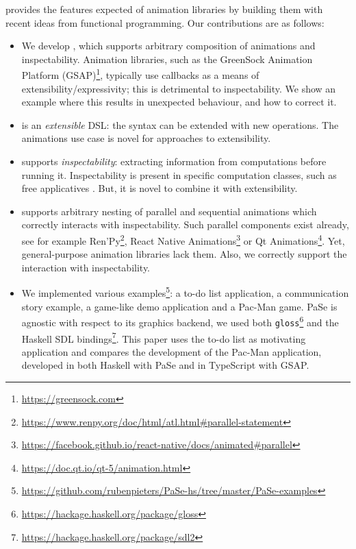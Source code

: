 \dsl{} provides the features expected of animation libraries by building them with recent ideas from functional programming. Our contributions are as follows:
\begin{itemize}
\item We develop \dsl{}, which supports arbitrary composition of animations and inspectability. Animation libraries, such as the GreenSock Animation Platform (GSAP)\footnote{\url{https://greensock.com}}, typically use callbacks as a means of extensibility/expressivity; this is detrimental to inspectability. We show an example where this results in unexpected behaviour, and how to correct it.
\item \dsl{} is an \emph{extensible} DSL: the syntax can be extended with new operations. The animations use case is novel for approaches to extensibility.
\item \dsl{} supports \emph{inspectability}: extracting information from computations before running it. Inspectability is present in specific computation classes, such as free applicatives \cite{DBLP:journals/corr/CapriottiK14}. But, it is novel to combine it with extensibility.
\item \dsl{} supports arbitrary nesting of parallel and sequential animations which correctly interacts with inspectability. Such parallel components exist already, see for example Ren'Py\footnote{\url{https://www.renpy.org/doc/html/atl.html\#parallel-statement}}, React Native Animations\footnote{\url{https://facebook.github.io/react-native/docs/animated\#parallel}} or Qt Animations\footnote{\url{https://doc.qt.io/qt-5/animation.html}}. Yet, general-purpose animation libraries lack them. Also, we correctly support the interaction with inspectability.
\item We implemented various examples\footnote{\url{https://github.com/rubenpieters/PaSe-hs/tree/master/PaSe-examples}}: a to-do list application, a communication story example, a game-like demo application and a Pac-Man game. PaSe is agnostic with respect to its graphics backend, we used both \texttt{gloss}\footnote{\url{https://hackage.haskell.org/package/gloss}} and the Haskell SDL bindings\footnote{\url{https://hackage.haskell.org/package/sdl2}}. This paper uses the to-do list as motivating application and compares the development of the Pac-Man application, developed in both Haskell with PaSe and in TypeScript with GSAP.
\end{itemize}
